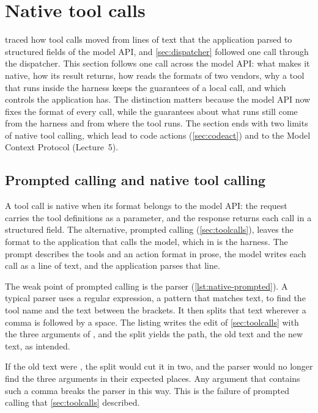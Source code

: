 \section{Native tool calls}
\label{sec:native}

 traced how tool calls moved from lines of text that the application parsed to
structured fields of the model API, and \cref{sec:dispatcher} followed one call through the
dispatcher. This section follows one call across the model API: what makes it native, how its
result returns, how \msa{} reads the formats of two vendors, why a tool that runs inside the harness
keeps the guarantees of a local call, and which controls the application has. The distinction
matters because the model API now fixes the format of every call, while the guarantees about what
runs still come from the harness and from where the tool runs. The section ends with two limits of
native tool calling, which lead to code actions (\cref{sec:codeact}) and to the Model Context Protocol
(Lecture~5).

\subsection{Prompted calling and native tool calling}
\label{sec:native-prompted}

A tool call is native when its format belongs to the model API: the request carries the tool
definitions as a parameter, and the response returns each call in a structured field. The
alternative, prompted calling (\cref{sec:toolcalls}), leaves the format to the application that
calls the model, which in \msa{} is the harness. The prompt describes the tools and an action format
in prose, the model writes each call as a line of text, and the application parses that line.

The weak point of prompted calling is the parser (\cref{lst:native-prompted}). A typical parser
uses a regular expression, a pattern that matches text, to find the tool name and the text between
the brackets. It then splits that text wherever a comma is followed by a space. The listing writes
the edit of \cref{sec:toolcalls} with the three arguments of , and the split yields
the path, the old text and the new text, as intended.

If the old text were , the split would cut it in two, and the parser would no
longer find the three arguments in their expected places. Any argument that contains such a comma
breaks the parser in this way. This is the failure of prompted calling that \cref{sec:toolcalls}
described.


